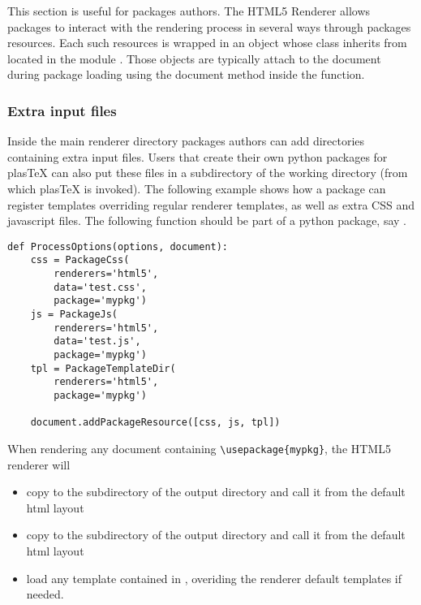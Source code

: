 This section is useful for packages authors. The HTML5 Renderer allows
packages to interact with the rendering process in several ways through
packages resources. Each such resources is wrapped in an object whose
class inherits from  located in the module
. Those objects are typically attach to
the document during package loading using the document
 method inside the 
function.

\subsubsection*{Extra input files}

Inside the main renderer directory 
packages authors can add directories containing extra input files. 
Users that create their own python packages for plasTeX can also put
these files in a subdirectory of the working directory (from which
plasTeX is invoked). The following example shows how a package can
register templates overriding regular renderer templates, as well as
extra CSS and javascript files. The following function should be part of a python package, say .

\begin{verbatim}
def ProcessOptions(options, document):
    css = PackageCss(
        renderers='html5',
        data='test.css',
        package='mypkg')
    js = PackageJs(
        renderers='html5',
        data='test.js',
        package='mypkg')
    tpl = PackageTemplateDir(
        renderers='html5',
        package='mypkg')

    document.addPackageResource([css, js, tpl])
\end{verbatim}

When rendering any document containing \verb+\usepackage{mypkg}+,
the HTML5 renderer will
\begin{itemize}
\item 
    copy 
    to the  subdirectory of the output directory
    and call it from the default html layout
\item 
    copy 
    to the  subdirectory of the output directory
    and call it from the default html layout
\item
    load any template contained in , overiding the renderer default templates if needed.
\end{itemize}


